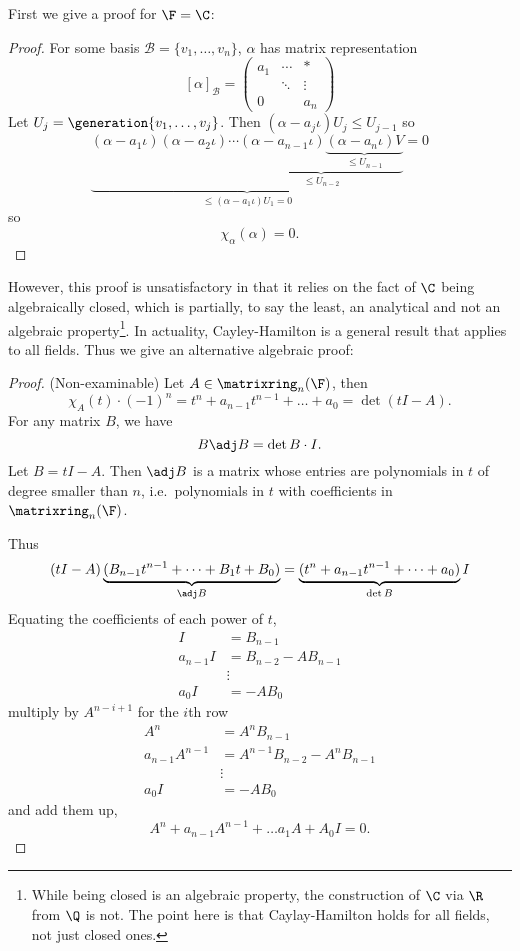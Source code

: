 \documentclass[a4paper]{article}
\newcommand*{\M}{\matrixring}
\newcommand*{\spans}{\generation}
\newcommand*{\basis}{\mathcal}
\theoremstyle{definition}
\begin{document}
First we give a proof for \(\F = \C\):

\begin{proof}
  For some basis \(\basis B = \{v_1, \dots, v_n\}\), \(\alpha\) has matrix representation
  \[
    [\alpha]_{\basis B} =
    \begin{pmatrix}
      a_1 & \cdots & * \\
      & \ddots & \vdots \\
      0 & & a_n
    \end{pmatrix}
  \]
  Let \(U_j = \spans{v_1, \dots, v_j}\). Then \((\alpha - a_j \iota) U_j \leq U_{j - 1}\) so
  \[
    \underbrace{(\alpha - a_1 \iota) (\alpha - a_2 \iota) \cdots \underbrace{(\alpha - a_{n - 1} \iota) \underbrace{(\alpha - a_n \iota) V}_{\leq U_{n - 1}}}_{\leq U_{n - 2}}}_{\leq (\alpha - a_1\iota) U_1 = 0} = 0
  \]
  so
  \[
    \chi_\alpha(\alpha) = 0.
  \]
\end{proof}

However, this proof is unsatisfactory in that it relies on the fact of \(\C\) being algebraically closed, which is partially, to say the least, an analytical and not an algebraic property\footnote{While being closed is an algebraic property, the construction of \(\C\) via \(\R\) from \(\Q\) is not. The point here is that Caylay-Hamilton holds for all fields, not just closed ones.}. In actuality, Cayley-Hamilton is a general result that applies to all fields. Thus we give an alternative algebraic proof:

\begin{proof}(Non-examinable)
  Let \(A \in \M_n(\F)\), then
  \[
    \chi_A(t) \cdot (-1)^n = t^n + a_{n - 1}t^{n - 1} + \dots + a_0 = \det(tI - A).
  \]
  For any matrix \(B\), we have
  \[
    B \adj B = \det B \cdot I.
  \]
  Let \(B = tI - A\). Then \(\adj B\) is a matrix whose entries are polynomials in \(t\) of degree smaller than \(n\), i.e.\ polynomials in \(t\) with coefficients in \(\M_n(\F)\).

  Thus
  \[
    (tI - A) \underbrace{(B_{n - 1}t^{n - 1} + \cdots + B_1 t + B_0)}_{\adj B} = \underbrace{(t^n + a_{n - 1}t^{n - 1} + \cdots + a_0)}_{\det B} I
  \]
  Equating the coefficients of each power of \(t\),
  \begin{align*}
    I &= B_{n - 1} \\
    a_{n - 1} I &= B_{n - 2} - AB_{n - 1} \\
    & \vdots \\
    a_0 I &= -AB_0
  \end{align*}
  multiply by \(A^{n - i + 1}\) for the \(i\)th row
  \begin{align*}
    A^n &= A^n B_{n - 1} \\
    a_{n - 1} A^{n - 1} &= A^{n - 1} B_{n - 2} - A^n B_{n - 1} \\
    & \vdots \\
    a_0 I &= -AB_0
  \end{align*}
  and add them up,
  \[
    A^n + a_{n - 1}A^{n - 1} + \dots a_1 A + A_0 I = 0.
  \]
\end{proof}
\end{document}
